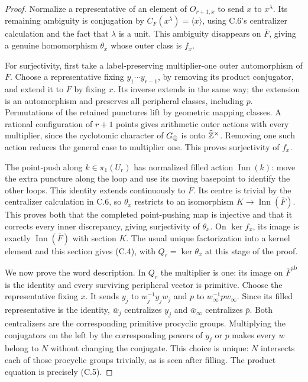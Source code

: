 \begin{proof}
Normalize a representative of an element of $O_{r+1,x}$ to send $x$ to $x^\lambda$. Its remaining ambiguity is conjugation by $C_F(x^\lambda)=\langle x\rangle$, using C.6's centralizer calculation and the fact that $\lambda$ is a unit. This ambiguity disappears on $\bar F$, giving a genuine homomorphism $\theta_x$ whose outer class is $f_x$.

For surjectivity, first take a label-preserving multiplier-one outer automorphism of $\bar F$. Choose a representative fixing $y_1\cdots y_{r-1}$, by removing its product conjugator, and extend it to $F$ by fixing $x$. Its inverse extends in the same way; the extension is an automorphism and preserves all peripheral classes, including $p$. Permutations of the retained punctures lift by geometric mapping classes. A rational configuration of $r+1$ points gives arithmetic outer actions with every multiplier, since the cyclotomic character of $G_{\mathbb Q}$ is onto $\widehat{\mathbb Z}^\times$. Removing one such action reduces the general case to multiplier one. This proves surjectivity of $f_x$.

The point-push along $k\in\pi_1(U_r)$ has normalized filled action $\operatorname{Inn}(k)$: move the extra puncture along the loop and use its moving basepoint to identify the other loops. This identity extends continuously to $\bar F$. Its centre is trivial by the centralizer calculation in C.6, so $\theta_x$ restricts to an isomorphism $K\to\operatorname{Inn}(\bar F)$. This proves both that the completed point-pushing map is injective and that it corrects every inner discrepancy, giving surjectivity of $\theta_x$. On $\ker f_x$, its image is exactly $\operatorname{Inn}(\bar F)$ with section $K$. The usual unique factorization into a kernel element and this section gives (C.4), with $Q_r=\ker\theta_x$ at this stage of the proof.

We now prove the word description. In $Q_r$ the multiplier is one: its image on $\bar F^{\mathrm{ab}}$ is the identity and every surviving peripheral vector is primitive. Choose the representative fixing $x$. It sends $y_j$ to $w_j^{-1}y_jw_j$ and $p$ to $w_\infty^{-1}p w_\infty$. Since its filled representative is the identity, $\bar w_j$ centralizes $y_j$ and $\bar w_\infty$ centralizes $\bar p$. Both centralizers are the corresponding primitive procyclic groups. Multiplying the conjugators on the left by the corresponding powers of $y_j$ or $p$ makes every $w$ belong to $N$ without changing the conjugate. This choice is unique: $N$ intersects each of those procyclic groups trivially, as is seen after filling. The product equation is precisely (C.5).


\end{proof}
